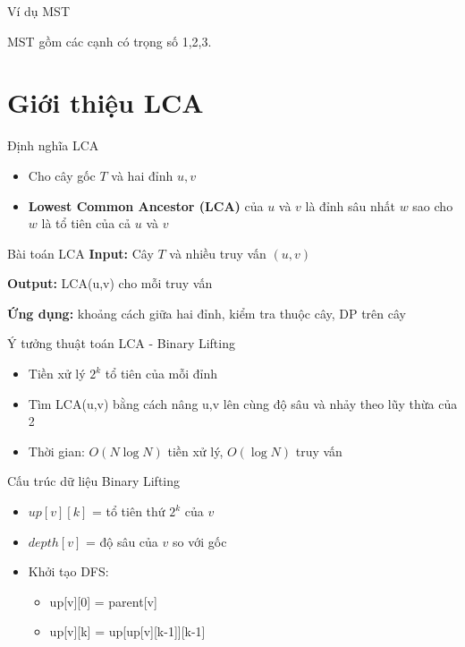 \documentclass[aspectratio=169]{beamer}
\begin{document}
\begin{frame}{Ví dụ MST}
\begin{center}

MST gồm các cạnh có trọng số 1,2,3.
\end{center}
\end{frame}

\section{Giới thiệu LCA}
\begin{frame}{Định nghĩa LCA}
\begin{itemize}
    \item Cho cây gốc $T$ và hai đỉnh $u,v$
    \item \textbf{Lowest Common Ancestor (LCA)} của $u$ và $v$ là đỉnh sâu nhất $w$ sao cho $w$ là tổ tiên của cả $u$ và $v$
\end{itemize}
\end{frame}

\begin{frame}{Bài toán LCA}
\textbf{Input:} Cây $T$ và nhiều truy vấn $(u,v)$

\textbf{Output:} LCA(u,v) cho mỗi truy vấn

\textbf{Ứng dụng:} khoảng cách giữa hai đỉnh, kiểm tra thuộc cây, DP trên cây
\end{frame}

\begin{frame}{Ý tưởng thuật toán LCA - Binary Lifting}
\begin{itemize}
    \item Tiền xử lý $2^k$ tổ tiên của mỗi đỉnh
    \item Tìm LCA(u,v) bằng cách nâng u,v lên cùng độ sâu và nhảy theo lũy thừa của 2
    \item Thời gian: $O(N\log N)$ tiền xử lý, $O(\log N)$ truy vấn
\end{itemize}
\end{frame}

\begin{frame}{Cấu trúc dữ liệu Binary Lifting}
\begin{itemize}
    \item $up[v][k]$ = tổ tiên thứ $2^k$ của $v$
    \item $depth[v]$ = độ sâu của $v$ so với gốc
    \item Khởi tạo DFS:
    \begin{itemize}
        \item up[v][0] = parent[v]
        \item up[v][k] = up[up[v][k-1]][k-1]
    \end{itemize}
\end{itemize}
\end{frame}
\end{document}
